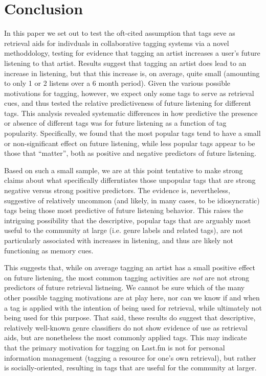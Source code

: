 \section{Conclusion}
\label{sec_conclusion}
In this paper we set out to test the oft-cited assumption that tags  seve as retrieval aids for indivduals in collaborative tagging systems via a novel methoddology, testing for evidence that tagging an artist increases a user's future listening to that artist. Results suggest that tagging an artist does lead to an increase in listening, but that this increase is, on average, quite small (amounting to only 1 or 2 listens over a 6 month period). Given the various possible motivations for tagging, however, we expect only some tags to serve as retrieval cues, and thus tested the relative predictiveness of future listening for different tags. This analysis revealed systematic differences in how predictive the presence or absence of different tags was for future listening as a function of tag popularity. Specifically, we found that the most popular tags tend to have a small or non-significant effect on future listening, while less popular tags appear to be those that ``matter'', both as positive and negative predictors of future listening.

Based on such a small sample, we are at this point tentative to make strong claims about what specifically differntiates those unpopular tags that are strong negative versus strong positive predictors. The evidence is, nevertheless, suggestive of relatively uncommon (and likely, in many cases, to be idiosyncratic) tags being those most predictive of future listening behavior. This raises the intriguing possibility that the descriptive, popular tags that are arguably most useful to the community at large (i.e. genre labels and related tags), are not particularly associated with increases in listening, and thus are likely not functioning as memory cues. 

This suggests that, while on average tagging an artist  has a small positive effect on future listening, the most common tagging activities are \emph{not} are not strong predictors of future retrieval listneing. We cannot be sure which of the many other possible tagging motivations are at play here, nor can we know if and when a tag is applied with the intention of being used for retrieval, while ultimately not being used for this purpose. That said, these results do suggest that descriptive, relatively well-known genre classifiers do not show evidence of use as retrieval aids, but are nonetheless the most commonly applied tags. This may indicate that the primary motivation for tagging on Last.fm is not for personal information management (tagging a resource for one's own retrieval), but rather is socially-oriented, resulting in tags that are useful for the community at larger.

